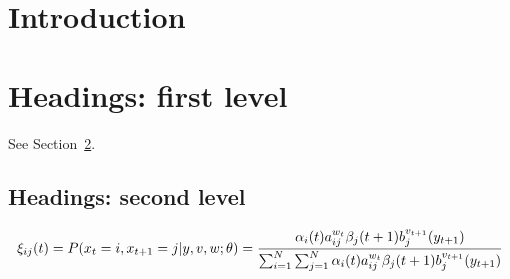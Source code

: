\documentclass{article}
\begin{document}
\section{Introduction}
\section{Headings: first level}
\label{sec:headings}
See Section~\ref{sec:headings}.

\subsection{Headings: second level}

\begin{equation}
	\xi_{ij}(t) = P(x_{t} = i,x_{t + 1} = j|y,v,w; \theta) \\
	= \frac{\alpha_{i}(t) a^{w_{t}}_{ij} \beta_{j}(t + 1) b^{v_{t + 1}}_{j}(y_{t + 1})}{\sum_{i = 1}^{N} \sum_{j = 1}^{N} \alpha_{i}(t) a^{w_{t}}_{ij} \beta_{j}(t + 1) b^{v_{t + 1}}_{j}(y_{t + 1})}
\end{equation}

\cite{author:title}

\printbibliography
\end{document}
